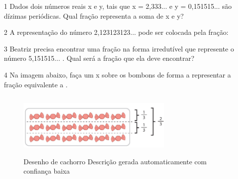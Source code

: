 \num{1} Dados dois números reais x e y, tais que x = 2,333... e y =
0,151515... são dízimas periódicas. Qual fração representa a soma de x
e y?


\num{2} A representação do número 2,123123123... pode ser colocada pela
fração:


\num{3} Beatriz precisa encontrar uma fração na forma irredutível que
represente o número 5,151515... . Qual será a fração que ela deve
encontrar?


\num{4} Na imagem abaixo, faça um x sobre os bombons de forma a
representar a fração equivalente a .


\begin{figure}
\centering
\includegraphics[width=2.9871in,height=1.23958in]{./_SAEB_9_MAT/media/image43.png}
\caption{Desenho de cachorro Descrição gerada automaticamente com
confiança baixa}
\end{figure}


